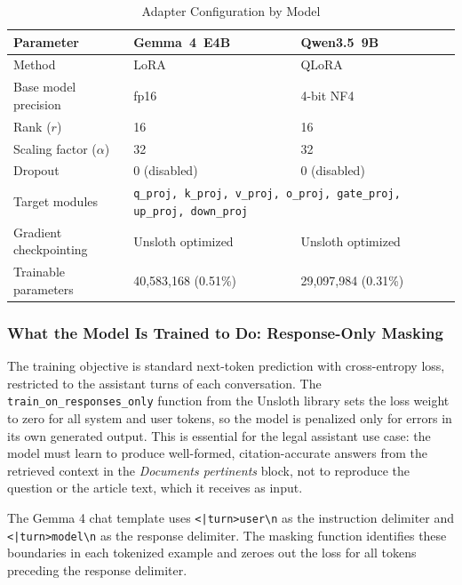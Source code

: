 \begin{table}[H]
\centering
\caption{Adapter Configuration by Model}
\label{tab:lora-config}
\renewcommand{\arraystretch}{1.3}
\begin{tabular}{|p{5cm}|p{4.5cm}|p{4.5cm}|}
\hline
\textbf{Parameter} & \textbf{Gemma~4~E4B} & \textbf{Qwen3.5~9B} \\
\hline
Method & \ac{LoRA} & \ac{QLoRA} \\
\hline
Base model precision & fp16 & 4-bit NF4 \\
\hline
Rank ($r$) & 16 & 16 \\
\hline
Scaling factor ($\alpha$) & 32 & 32 \\
\hline
Dropout & 0 (disabled) & 0 (disabled) \\
\hline
Target modules & \multicolumn{2}{p{9cm}|}{\texttt{q\_proj, k\_proj, v\_proj, o\_proj, gate\_proj, up\_proj, down\_proj}} \\
\hline
Gradient checkpointing & Unsloth optimized & Unsloth optimized \\
\hline
Trainable parameters & 40,583,168 (0.51\%) & 29,097,984 (0.31\%) \\
\hline
\end{tabular}
\end{table}

\subsubsection{What the Model Is Trained to Do: Response-Only Masking}

The training objective is standard next-token prediction with cross-entropy loss, restricted to the assistant turns of each conversation. The \texttt{train\_on\_responses\_only} function from the Unsloth library \cite{unsloth2024} sets the loss weight to zero for all system and user tokens, so the model is penalized only for errors in its own generated output. This is essential for the legal assistant use case: the model must learn to produce well-formed, citation-accurate answers from the retrieved context in the \textit{Documents pertinents} block, not to reproduce the question or the article text, which it receives as input.

\vspace{1em}

The Gemma 4 chat template uses \texttt{<|turn>user\textbackslash n} as the instruction delimiter and 
\texttt{<|turn>model\textbackslash n} as the response delimiter. The masking function identifies these boundaries in each tokenized example and zeroes out the loss for all tokens preceding the response delimiter.

